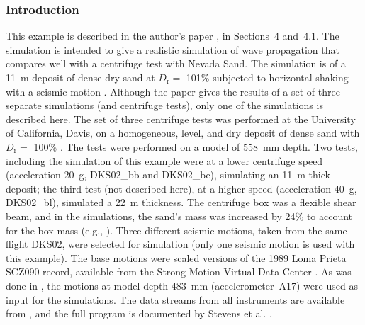 \documentclass[letterpaper,11pt]{article}
\begin{document}
\subsubsection{Introduction}
This example is described in the author's paper \cite{Kuhn:2021a},
in Sections~4 and~4.1.
The simulation is intended to give a realistic simulation
of wave propagation that compares well with a
centrifuge test with Nevada Sand.
The simulation is of a
11~m deposit of dense dry sand at $D_{\text{r}}=$ 101\%
subjected to horizontal shaking
with a seismic motion \cite{Stevens:1999a}.
Although the paper gives the results of a set of three separate
simulations (and centrifuge tests),
only one of the simulations is described here.
%
The set of three centrifuge tests was
performed at the University of California, Davis, on a
homogeneous, level, and dry deposit of
dense sand with $D_{\text{r}}=$ 100\%
\cite{Stevens:1999a}.
The tests were performed on a model of 558~mm depth.
Two tests, including the simulation of this example
were at a lower centrifuge speed
(acceleration 20~g, DKS02\_bb and DKS02\_be),
simulating an 11~m thick deposit;
the third test (not described here),
at a higher speed (acceleration 40~g, DKS02\_bl),
simulated a 22~m thickness.
The centrifuge box was a flexible shear beam,
and in the simulations, the sand's mass was
increased by 24\% to account for the box mass
(e.g., \cite{Elgamal:2005a}). 
Three different seismic motions, taken from the same flight DKS02,
were selected for simulation (only one seismic motion is
used with this example).
The base motions were scaled versions of the 
1989 Loma Prieta SCZ090 record,
available from the Strong-Motion Virtual Data Center \cite{VDC:2021a}.
As was done in \cite{Elgamal:2005a},
the motions at model depth 483~mm
(accelerometer~A17)
were used as input for the simulations. 
The data streams from all instruments are available from
\cite{CGM:2021a}, and the full program is documented by
Stevens et al. \cite{Stevens:1999a}.
%
\end{document}
